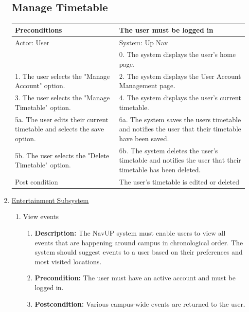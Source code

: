 \documentclass{article}
\begin{document}
\begin{enumerate}
	\subsection{Manage Timetable}
	\begin{tabular}{ | m{15em} | m{15em}| }
		\hline
		Preconditions                                                       				& The user must be logged in \\ 				
		\hline
		Actor: User                                                       					& System: Up Nav \\ 			
		\hline
                                                                  							& 0. The system displays the user's home page. \\                                                           
		 \hline
		1. The user selects the "Manage Account" option.				& 2. The system displays the User Account Management page. \\
		 \hline
		3. The user selects the "Manage Timetable" option. 				& 4.  The system displays the user's current timetable. \\
		\hline
		5a. The user edits their current timetable and selects the save option. 	& 6a. The system saves the users timetable and notifies the user that their timetable have been saved. \\ 
		\hline
		5b. The user selects the "Delete Timetable"  option.				&6b. The system deletes the user's timetable  and notifies the user that their timetable has been deleted. \\
		\hline
		Post condition                                                     				& The user's timetable is edited or deleted \\ 			
		\hline
	\end{tabular}
	
	
	\item \underline{Entertainment Subsystem}
			\begin{enumerate}
		\item View events
		\begin{enumerate}
			\item \textbf{Description:} The NavUP system must enable users to view all events that are happening around campus in chronological order. The system should suggest events to a user based on their preferences and most visited locations.
			\item \textbf{Precondition:} The user must have an active account and must be logged in.
			\item \textbf{Postcondition:} Various campus-wide events are returned to the user.\newline
		\end{enumerate}
		

\end{enumerate}
\end{enumerate}
\end{document}
